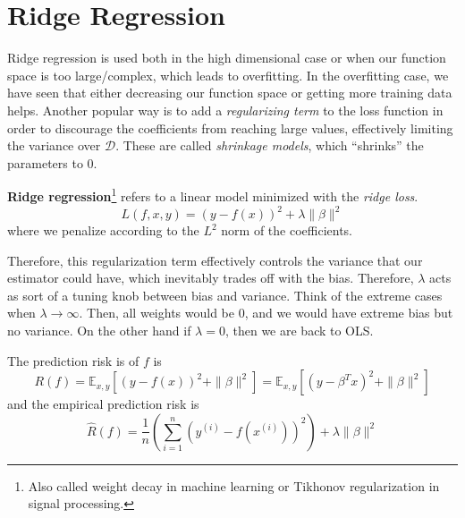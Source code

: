 \section{Ridge Regression} 

  Ridge regression is used both in the high dimensional case or when our function space is too large/complex, which leads to overfitting. In the overfitting case, we have seen that either decreasing our function space or getting more training data helps. Another popular way is to add a \textit{regularizing term} to the loss function in order to discourage the coefficients from reaching large values, effectively limiting the variance over $\mathcal{D}$. These are called \textit{shrinkage models}, which ``shrinks'' the parameters to $0$. 

  \begin{definition}
    \textbf{Ridge regression}\footnote{Also called weight decay in machine learning or Tikhonov regularization in signal processing.} refers to a linear model minimized with the \textit{ridge loss}. 
    \begin{equation} 
      L(f, x, y) = (y - f(x))^2 + \lambda \|\beta\|^2
    \end{equation}
    where we penalize according to the $L^2$ norm of the coefficients. 
  \end{definition} 

  Therefore, this regularization term effectively controls the variance that our estimator could have, which inevitably trades off with the bias. Therefore, $\lambda$ acts as sort of a tuning knob between bias and variance. Think of the extreme cases when $\lambda \to \infty$. Then, all weights would be $0$, and we would have extreme bias but no variance. On the other hand if $\lambda = 0$, then we are back to OLS. 

  \begin{lemma}[Risk]
    The prediction risk is of $f$ is 
    \begin{equation}
      R(f) = \mathbb{E}_{x, y} \left[ (y - f(x))^2 + \|\beta\| ^2 \right] = \mathbb{E}_{x, y} \left[ (y - \beta^T x)^2 + \|\beta\|^2 \right]
    \end{equation}
    and the empirical prediction risk is 
    \begin{equation}
      \hat{R}(f) = \frac{1}{n} \left( \sum_{i=1}^n (y^{(i)} - f(x^{(i)}))^2 \right) + \lambda \|\beta\|^2 
    \end{equation}
  \end{lemma} 

